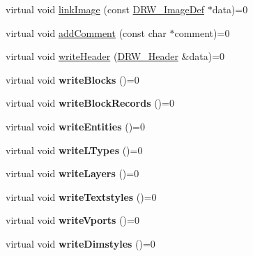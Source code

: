 \begin{DoxyCompactItemize}
\item 
virtual void \hyperlink{classDRW__Interface_a8f7969f1639e6544e82446bc21e71446}{link\-Image} (const \hyperlink{classDRW__ImageDef}{D\-R\-W\-\_\-\-Image\-Def} $\ast$data)=0
\item 
virtual void \hyperlink{classDRW__Interface_a4b9bb278a16a1ceaa53ebe05dab93b42}{add\-Comment} (const char $\ast$comment)=0
\item 
virtual void \hyperlink{classDRW__Interface_ad3f7609afebe0aee604395f580262cf7}{write\-Header} (\hyperlink{classDRW__Header}{D\-R\-W\-\_\-\-Header} \&data)=0
\item 
\hypertarget{classDRW__Interface_ab033679b8fb632b12299c6b28e7d59c0}{virtual void {\bfseries write\-Blocks} ()=0}\label{classDRW__Interface_ab033679b8fb632b12299c6b28e7d59c0}

\item 
\hypertarget{classDRW__Interface_a935e2ac6db3d901741a9950e8d019c3d}{virtual void {\bfseries write\-Block\-Records} ()=0}\label{classDRW__Interface_a935e2ac6db3d901741a9950e8d019c3d}

\item 
\hypertarget{classDRW__Interface_a251679e5078dd1148b30db47afb5562b}{virtual void {\bfseries write\-Entities} ()=0}\label{classDRW__Interface_a251679e5078dd1148b30db47afb5562b}

\item 
\hypertarget{classDRW__Interface_a5861b516697eec90dff9a9691fd8260b}{virtual void {\bfseries write\-L\-Types} ()=0}\label{classDRW__Interface_a5861b516697eec90dff9a9691fd8260b}

\item 
\hypertarget{classDRW__Interface_ae9365ca59260b160fe9a3450fae5a953}{virtual void {\bfseries write\-Layers} ()=0}\label{classDRW__Interface_ae9365ca59260b160fe9a3450fae5a953}

\item 
\hypertarget{classDRW__Interface_a883e96a714611a55b07eff817066660a}{virtual void {\bfseries write\-Textstyles} ()=0}\label{classDRW__Interface_a883e96a714611a55b07eff817066660a}

\item 
\hypertarget{classDRW__Interface_a52db31c4037c43b42e3d8813853a62f4}{virtual void {\bfseries write\-Vports} ()=0}\label{classDRW__Interface_a52db31c4037c43b42e3d8813853a62f4}

\item 
\hypertarget{classDRW__Interface_a4b191d404ca1b98173856727d62113ce}{virtual void {\bfseries write\-Dimstyles} ()=0}\label{classDRW__Interface_a4b191d404ca1b98173856727d62113ce}

\end{DoxyCompactItemize}


